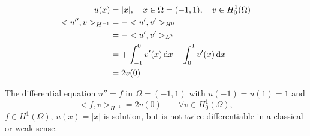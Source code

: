 \begin{example}
	\begin{align*}
	u(x)&=|x|,\quad x \in \Omega = (-1,1), \quad v \in H^1_0(\Omega)\\
	<u'',v>_{H^{-1} } &= -<u',v'>_{H^0 }\\
	&= -<u',v'>_{L^2} \\
	&= +\int^0_{-1} v'(x) \mathop{}\!\mathrm{d} x - \int^1_0 v'(x) \mathop{}\!\mathrm{d} x\\
	&= 2 v(0)
	\end{align*}
	
	The differential equation $u'' = f$ in $\Omega = (-1,1)$ with $u(-1)= u(1) =1$ and
	\begin{equation*}
	<f,v>_{H^{-1} } = 2v(0)\qquad \forall v \in H^1_0(\Omega),
	\end{equation*} 
	$f \in H^1(\Omega)$, $u(x)=|x|$ is solution, but is not twice differentiable in a classical or weak sense.
\end{example}


